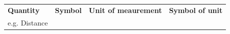 \begin{enumerate}[noitemsep, label=\textbf{\arabic*}. ]
{{    \addtocounter{footnote}{-0}
    
          }{ %
        
    
        \begin{center}
      
      \label{m38776*id68187}
      
    \noindent
      \tablelasttail{}
      \begin{xtabular}[t]{|l|l|l|l|}\hline
    
    
        \textbf{Quantity} &
    
    
        \textbf{Symbol} &
    
    
        \textbf{Unit of meaurement} &
    
    
        \textbf{Symbol of unit}%
     \tabularnewline{}
    
    
        e.g. Distance &
    
    

\end{xtabular}
\end{center}}}
\end{enumerate}
